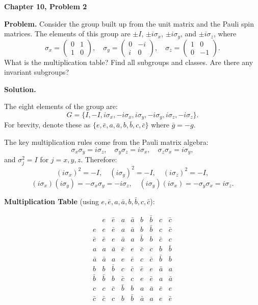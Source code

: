 \documentclass[12pt]{article}
\begin{document}
\begin{center}
{\Large\bfseries Chapter 10, Problem 2}
\end{center}

\noindent\textbf{Problem.} Consider the group built up from the unit matrix and the Pauli spin matrices. The elements of this group are $\pm I$, $\pm i\sigma_x$, $\pm i\sigma_y$, and $\pm i\sigma_z$, where
\[
\sigma_x = \begin{pmatrix} 0 & 1 \\ 1 & 0 \end{pmatrix}, \quad
\sigma_y = \begin{pmatrix} 0 & -i \\ i & 0 \end{pmatrix}, \quad
\sigma_z = \begin{pmatrix} 1 & 0 \\ 0 & -1 \end{pmatrix}.
\]
What is the multiplication table? Find all subgroups and classes. Are there any invariant subgroups?

\bigskip
\noindent\textbf{Solution.}

The eight elements of the group are:
\[
G = \{I, -I, i\sigma_x, -i\sigma_x, i\sigma_y, -i\sigma_y, i\sigma_z, -i\sigma_z\}.
\]
For brevity, denote these as $\{e, \bar{e}, a, \bar{a}, b, \bar{b}, c, \bar{c}\}$ where $\bar{g} = -g$.

The key multiplication rules come from the Pauli matrix algebra:
\[
\sigma_x \sigma_y = i\sigma_z, \quad \sigma_y \sigma_z = i\sigma_x, \quad \sigma_z \sigma_x = i\sigma_y,
\]
and $\sigma_j^2 = I$ for $j = x, y, z$. Therefore:
\[
(i\sigma_x)^2 = -I, \quad (i\sigma_y)^2 = -I, \quad (i\sigma_z)^2 = -I,
\]
\[
(i\sigma_x)(i\sigma_y) = -\sigma_x\sigma_y = -i\sigma_z, \quad
(i\sigma_y)(i\sigma_x) = -\sigma_y\sigma_x = i\sigma_z.
\]

\noindent\textbf{Multiplication Table} (using $e, \bar{e}, a, \bar{a}, b, \bar{b}, c, \bar{c}$):

\[
\begin{array}{c|cccccccc}
 & e & \bar{e} & a & \bar{a} & b & \bar{b} & c & \bar{c} \\
\hline
e & e & \bar{e} & a & \bar{a} & b & \bar{b} & c & \bar{c} \\
\bar{e} & \bar{e} & e & \bar{a} & a & \bar{b} & b & \bar{c} & c \\
a & a & \bar{a} & \bar{e} & e & \bar{c} & c & b & \bar{b} \\
\bar{a} & \bar{a} & a & e & \bar{e} & c & \bar{c} & \bar{b} & b \\
b & b & \bar{b} & c & \bar{c} & \bar{e} & e & \bar{a} & a \\
\bar{b} & \bar{b} & b & \bar{c} & c & e & \bar{e} & a & \bar{a} \\
c & c & \bar{c} & \bar{b} & b & a & \bar{a} & \bar{e} & e \\
\bar{c} & \bar{c} & c & b & \bar{b} & \bar{a} & a & e & \bar{e}
\end{array}
\]
\end{document}
